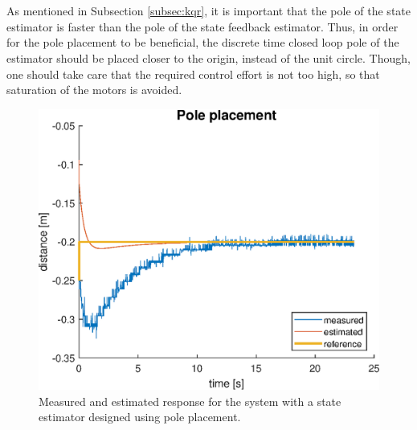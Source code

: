 \documentclass[a4paper,kul]{kulakarticle} %
\begin{document}
\\\\
As mentioned in Subsection \ref{subsec:kqr}, it is important that the pole of the state estimator is faster than the pole of the state feedback estimator. Thus, in order for the pole placement to be beneficial, the discrete time closed loop pole of the estimator should be placed closer to the origin, instead of the unit circle. Though, one should take care that the required control effort is not too high, so that saturation of the motors is avoided. 
\begin{figure}[htp!]
	\centering
	\includegraphics[width = 0.6\linewidth]{pole_placement.eps}
	\caption{Measured and estimated response for the system with a state estimator designed using pole placement.}
	\label{fig:pole_placement}
\end{figure}




















\newpage


\end{document}
